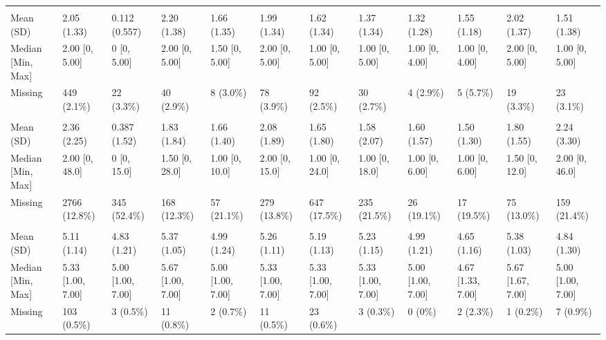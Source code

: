 \documentclass[
  single column]{article}
\begin{document}
\begin{landscape}
\begin{longtable}[t]{llllllllllll}
\addlinespace[0.3em]
\multicolumn{12}{l}{\textbf{Frequency of Alcohol Consumption}}\\
\hspace{1em}Mean (SD) & 2.05 (1.33) & 0.112 (0.557) & 2.20 (1.38) & 1.66 (1.35) & 1.99 (1.34) & 1.62 (1.34) & 1.37 (1.34) & 1.32 (1.28) & 1.55 (1.18) & 2.02 (1.37) & 1.51 (1.38)\\
\hspace{1em}Median [Min, Max] & 2.00 [0, 5.00] & 0 [0, 5.00] & 2.00 [0, 5.00] & 1.50 [0, 5.00] & 2.00 [0, 5.00] & 1.00 [0, 5.00] & 1.00 [0, 5.00] & 1.00 [0, 4.00] & 1.00 [0, 4.00] & 2.00 [0, 5.00] & 1.00 [0, 5.00]\\
\hspace{1em}Missing & 449 (2.1\%) & 22 (3.3\%) & 40 (2.9\%) & 8 (3.0\%) & 78 (3.9\%) & 92 (2.5\%) & 30 (2.7\%) & 4 (2.9\%) & 5 (5.7\%) & 19 (3.3\%) & 23 (3.1\%)\\
\addlinespace[0.3em]
\multicolumn{12}{l}{\textbf{Intensity of Alcohol Consumption}}\\
\hspace{1em}Mean (SD) & 2.36 (2.25) & 0.387 (1.52) & 1.83 (1.84) & 1.66 (1.40) & 2.08 (1.89) & 1.65 (1.80) & 1.58 (2.07) & 1.60 (1.57) & 1.50 (1.30) & 1.80 (1.55) & 2.24 (3.30)\\
\hspace{1em}Median [Min, Max] & 2.00 [0, 48.0] & 0 [0, 15.0] & 1.50 [0, 28.0] & 1.00 [0, 10.0] & 2.00 [0, 15.0] & 1.00 [0, 24.0] & 1.00 [0, 18.0] & 1.00 [0, 6.00] & 1.00 [0, 6.00] & 1.50 [0, 12.0] & 2.00 [0, 46.0]\\
\hspace{1em}Missing & 2766 (12.8\%) & 345 (52.4\%) & 168 (12.3\%) & 57 (21.1\%) & 279 (13.8\%) & 647 (17.5\%) & 235 (21.5\%) & 26 (19.1\%) & 17 (19.5\%) & 75 (13.0\%) & 159 (21.4\%)\\
\addlinespace[0.3em]
\multicolumn{12}{l}{\textbf{Sense of Belonging}}\\
\hspace{1em}Mean (SD) & 5.11 (1.14) & 4.83 (1.21) & 5.37 (1.05) & 4.99 (1.24) & 5.26 (1.11) & 5.19 (1.13) & 5.23 (1.15) & 4.99 (1.21) & 4.65 (1.16) & 5.38 (1.03) & 4.84 (1.30)\\
\hspace{1em}Median [Min, Max] & 5.33 [1.00, 7.00] & 5.00 [1.00, 7.00] & 5.67 [1.00, 7.00] & 5.00 [1.00, 7.00] & 5.33 [1.00, 7.00] & 5.33 [1.00, 7.00] & 5.33 [1.00, 7.00] & 5.00 [1.00, 7.00] & 4.67 [1.33, 7.00] & 5.67 [1.67, 7.00] & 5.00 [1.00, 7.00]\\
\hspace{1em}Missing & 103 (0.5\%) & 3 (0.5\%) & 11 (0.8\%) & 2 (0.7\%) & 11 (0.5\%) & 23 (0.6\%) & 3 (0.3\%) & 0 (0\%) & 2 (2.3\%) & 1 (0.2\%) & 7 (0.9\%)\\

\end{longtable}
\end{landscape}
\end{document}
